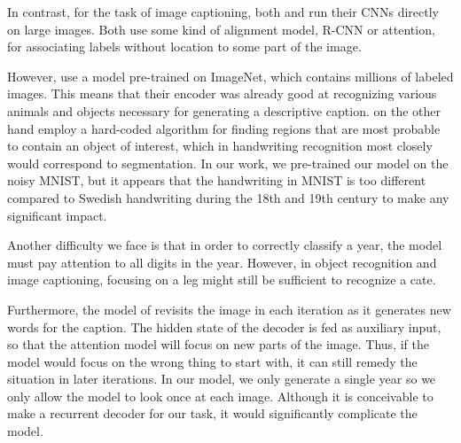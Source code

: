 
In contrast, for the task of image captioning, both \textcite{AttendAndTell} and \textcite{VisualSemanticAlignment} run their CNNs directly on large images. Both use some kind of alignment model, R-CNN or attention, for associating labels without location to some part of the image.

However, \textcite{AttendAndTell} use a model pre-trained on ImageNet, which contains millions of labeled images. This means that their encoder was already good at recognizing various animals and objects necessary for generating a descriptive caption. \textcite{VisualSemanticAlignment} on the other hand employ a hard-coded algorithm for finding regions that are most probable to contain an object of interest, which in handwriting recognition most closely would correspond to segmentation.
In our work, we pre-trained our model on the noisy MNIST, but it appears that the handwriting in MNIST is too different compared to Swedish handwriting during the 18th and 19th century to make any significant impact.

Another difficulty we face is that in order to correctly classify a year, the model must pay attention to all digits in the year. However, in object recognition and image captioning, focusing on a leg might still be sufficient to recognize a cate.

Furthermore, the model of \textcite{AttendAndTell} revisits the image in each iteration as it generates new words for the caption. The hidden state of the decoder is fed as auxiliary input, so that the attention model will focus on new parts of the image. Thus, if the model would focus on the wrong thing to start with, it can still remedy the situation in later iterations.
In our model, we only generate a single year so we only allow the model to look once at each image. Although it is conceivable to make a recurrent decoder for our task, it would significantly complicate the model.



